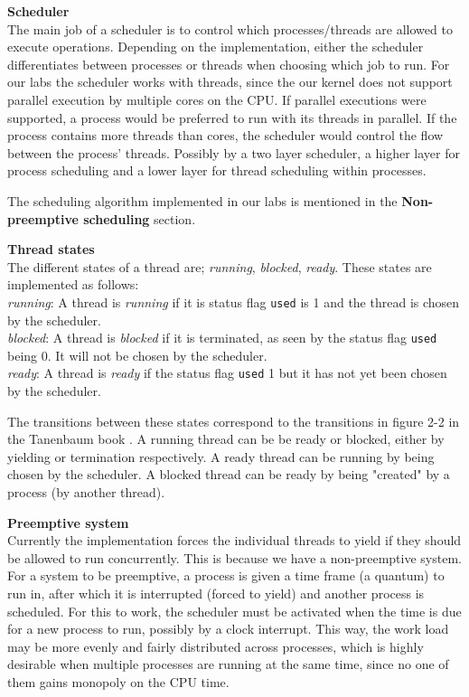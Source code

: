 \textbf{Scheduler}\\
The main job of a scheduler is to control which processes/threads are allowed to execute operations. Depending on the implementation, either the scheduler differentiates between processes or threads when choosing which job to run. For our labs the scheduler works with threads, since the our kernel does not support parallel execution by multiple cores on the CPU. If parallel executions were supported, a process would be preferred to run with its threads in parallel. If the process contains more threads than cores, the scheduler would control the flow between the process' threads. Possibly by a two layer scheduler, a higher layer for process scheduling and a lower layer for thread scheduling within processes.

The scheduling algorithm implemented in our labs is mentioned in the \textbf{Non-preemptive scheduling} section.

\textbf{Thread states}\\
The different states of a thread are; \textit{running}, \textit{blocked}, \textit{ready}. These states are implemented as follows:\\
\textit{running}: A thread is \textit{running} if it is status flag \texttt{used} is 1 and the thread is chosen by the scheduler. \\
\textit{blocked}: A thread is \textit{blocked} if it is terminated, as seen by the status flag \texttt{used} being 0. It will not be chosen by the scheduler.\\
\textit{ready}: A thread is \textit{ready} if the status flag \texttt{used} 1 but it has not yet been chosen by the scheduler.

The transitions between these states correspond to the transitions in figure 2-2 in the Tanenbaum book \cite{tanembaum}. A running thread can be be ready or blocked, either by yielding or termination respectively. A ready thread can be running by being chosen by the scheduler. A blocked thread can be ready by being "created" by a process (by another thread). 

\textbf{Preemptive system}\\
Currently the implementation forces the individual threads to yield if they should be allowed to run concurrently. This is because we have a non-preemptive system. For a system to be preemptive, a process is given a time frame (a quantum) to run in, after which it is interrupted (forced to yield) and another process is scheduled. For this to work, the scheduler must be activated when the time is due for a new process to run, possibly by a clock interrupt. This way, the work load may be more evenly and fairly distributed across processes, which is highly desirable when multiple processes are running at the same time, since no one of them gains monopoly on the CPU time.

